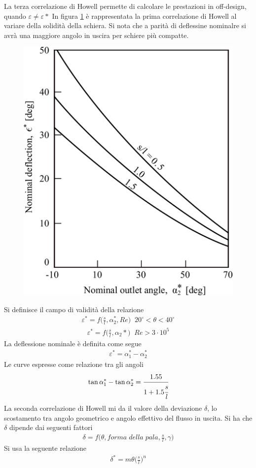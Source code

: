 La terza correlazione di Howell permette di calcolare le prestazioni in off-design, quando $\varepsilon \neq \varepsilon*$ 
In figura \ref{fig:1CorrHowell} è rappresentata la prima correlazione di Howell al variare della solidità della schiera. Si nota che a parità di deflessine nominalre si avrà una maggiore angolo in uscira per schiere più compatte.
\begin{figure}
\centering
  \includegraphics[width=.4\textwidth]{fig/1CorrHowell.pdf}
\caption{}
\label{fig:1CorrHowell}
\end{figure}
Si definisce il campo di validità della relazione
\begin{align*}
\varepsilon^* = f \bigg( \frac{s}{l}, \alpha_2^*, Re \bigg) \;\; 20^{\circ} < \theta < 40^{\circ}
\end{align*}
\begin{align*}
\varepsilon^* = f\bigg(\frac{s}{l}, \alpha_2*\bigg)\;\; Re > 3 \cdot 10^5
\end{align*}
La deflessione nominale è definita come segue
\begin{align*}
\varepsilon^* = \alpha_1^* - \alpha_2^*
\end{align*}
Le curve espresse come relazione tra gli angoli
\begin{align*}
\tan \alpha_1^* - \tan \alpha_2^* = \cfrac{1.55}{1 + 1.5 \cfrac{s}{l}}
\end{align*}
La seconda correlazione di Howell mi da il valore della deviazione $\delta$, lo scostamento tra angolo geometrico e angolo effettivo del flusso in uscita. Si ha che $\delta$ dipende dai seguenti fattori
\begin{align*}
\delta = f \bigg( \theta, forma \; della \; pala, \frac{s}{l}, \gamma \bigg)
\end{align*}
Si usa la seguente relazione
\begin{align*}
\delta^* = m \theta \bigg( \frac{s}{l} \bigg)^n
\end{align*}
